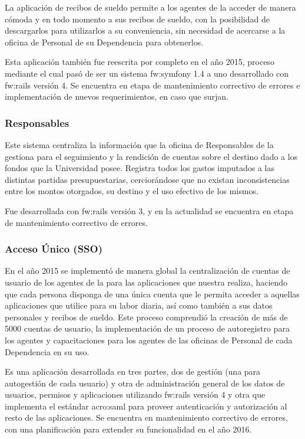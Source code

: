 La aplicación de recibos de sueldo permite a los agentes de la {\unlp} acceder de manera cómoda y en todo momento a sus recibos de sueldo, con la posibilidad de descargarlos para utilizarlos a su conveniencia, sin necesidad de acercarse a la oficina de Personal de su Dependencia para obtenerlos.

Esta aplicación también fue reescrita por completo en el año 2015, proceso mediante el cual pasó de ser un sistema \gls{fw:symfony} 1.4 a uno desarrollado con \gls{fw:rails} versión 4. Se encuentra en etapa de mantenimiento correctivo de errores e implementación de nuevos requerimientos, en caso que surjan.


\subsubsection{Responsables}
\label{anexo:detalle-clientes:responsables}

Este sistema centraliza la información que la oficina de Responsables de la {\unlp} gestiona para el seguimiento y la rendición de cuentas sobre el destino dado a los fondos que la Universidad posee. Registra todos los gastos imputados a las distintas partidas presupuestarias, cerciorándose que no existan inconsistencias entre los montos otorgados, su destino y el uso efectivo de los mismos.

Fue desarrollada con \gls{fw:rails} versión 3, y en la actualidad se encuentra en etapa de mantenimiento correctivo de errores.


\subsubsection{Acceso Único (SSO)}
\label{anexo:detalle-clientes:sso}

En el año 2015 se implementó de manera global la centralización de cuentas de usuario de los agentes de la {\unlp} para las aplicaciones que nuestra {\direccionDesarrollo} realiza, haciendo que cada persona disponga de una única cuenta que le permita acceder a aquellas aplicaciones que utilice para su labor diaria, así como también a sus datos personales y recibos de sueldo. Este proceso comprendió la creación de más de 5000 cuentas de usuario, la implementación de un proceso de autoregistro para los agentes y capacitaciones para los agentes de las oficinas de Personal de cada Dependencia en su uso.

Es una aplicación desarrollada en tres partes, dos de gestión (una para autogestión de cada usuario) y otra de administración general de los datos de usuarios, permisos y aplicaciones utilizando \gls{fw:rails} versión 4 y otra que implementa el estándar \gls{acro:saml} para proveer autenticación y autorización al resto de las aplicaciones. Se encuentra en mantenimiento correctivo de errores, con una planificación para extender su funcionalidad en el año 2016.


